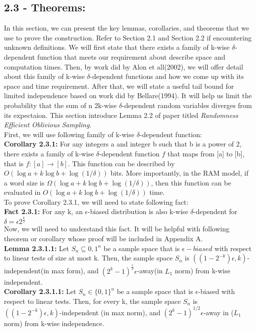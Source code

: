 \documentclass[a4paper, english]{paper}
\begin{document}
	\subsection{2.3 - Theorems:}
\quad	In this section, we can present the key lemmas, corollaries, and theorems that we use to prove the construction. Refer to Section 2.1 and Section 2.2 if encountering unknown definitions. We will first state that there exists a family of k-wise $\delta$-dependent function that meets our requirement about describe space and computation times. Then, by work did by Alon et all(2002), we will offer detail about this family of k-wise $\delta$-dependent functions and how we come up with its space and time requirement. After that, we will state a useful tail bound for limited independence based on work did by Bellare(1994). It will help us limit the probability that the sum of n 2k-wise $\delta$-dependent random variables diverges from its expectaion. This section introduce Lemma 2.2 of paper titled  \textit{Randomness Efficient Oblivious Sampling}.\\

	First, we will use following family of k-wise $\delta$-dependent function:\\
	\noindent\textbf{Corollary 2.3.1:} For any integers a and integer b such that b is a power of 2, there exists a family of k-wise $\delta$-dependent function $f$ that maps from [a] to [b], that is $f: [a] \rightarrow [b]$. This function can be described by $O(\log a + k\log b+ \log(1/\delta))$ bits. More importantly, in the RAM model, if a word size is $\Omega(\log a + k\log b+ \log(1/\delta))$, then this function can be evaluated in $O(\log a + k\log b+ \log(1/\delta))$ time. \\

	To prove Corollary 2.3.1, we will need to state following fact:\\
	\noindent\textbf{Fact 2.3.1:} For any k, an $\epsilon$-biased distribution is also k-wise $\delta$-dependent for $\delta=\epsilon2^{\frac k2}$\\

	Now, we will need to understand this fact. It will be helpful with following theorem or corollary whose proof will be included in Appendix A.\\
	\noindent\textbf{Lemma 2.3.1.1:} Let $S_n\subseteq{0,1}^n$ be a sample space that is $\epsilon-biased$ with respect to linear tests of size at most k. Then, the sample space $S_n$ is $((1-2^{-k})\epsilon,k)$-independent(in max form), and $(2^k-1)^{\frac12}\epsilon$-away(in $L_1$ norm) from k-wise independent.\\
	\noindent\textbf{Corollary 2.3.1.1:} Let $S_n \in \{0, 1\}^n$ be a sample space that is $\epsilon$-biased with respect to linear tests. Then, for every k, the sample space $S_n$ is $((1-2^{-k})\epsilon, k)$-independent (in max norm), and $(2^k-1)^{1/2}\epsilon$-away  in ($L_1$ norm) from k-wise independence. \\
\end{document}
